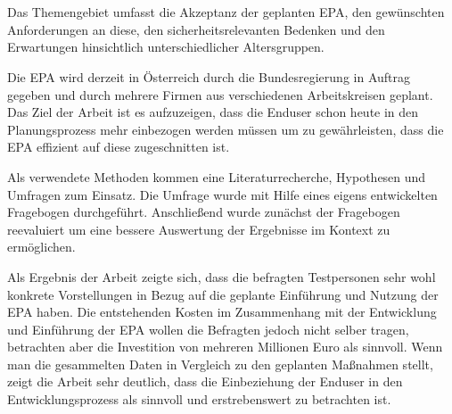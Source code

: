 
%
\section*{\thesisheading} %



 Das Themengebiet umfasst die Akzeptanz der geplanten
EPA, den gewünschten Anforderungen an diese, den sicherheitsrelevanten
Bedenken und den Erwartungen hinsichtlich unterschiedlicher Altersgruppen.~\cite[Kap.~1]{Baranyi2008}

 Die EPA wird derzeit in Österreich durch die
Bundesregierung in Auftrag gegeben und durch mehrere Firmen aus verschiedenen
Arbeitskreisen geplant. Das Ziel der Arbeit ist es aufzuzeigen, dass die
Enduser schon heute in den Planungsprozess mehr einbezogen werden müssen um zu
gewährleisten, dass die EPA effizient auf diese zugeschnitten ist.~\cite[Kap.~7]{Baranyi2008}

 Als verwendete Methoden kommen eine
Literaturrecherche, Hypothesen und Umfragen zum Einsatz. Die Umfrage wurde
mit Hilfe eines eigens entwickelten Fragebogen durchgeführt. Anschließend
wurde zunächst der Fragebogen reevaluiert um eine bessere Auswertung der
Ergebnisse im Kontext zu ermöglichen.~\cite[Kap.~5]{Baranyi2008}

 Als Ergebnis der Arbeit zeigte sich, dass die befragten
Testpersonen sehr wohl konkrete Vorstellungen in Bezug auf die geplante
Einführung und Nutzung der EPA haben. Die entstehenden Kosten im Zusammenhang
mit der Entwicklung und Einführung der EPA wollen die Befragten jedoch nicht
selber tragen, betrachten aber die Investition von mehreren Millionen Euro als
sinnvoll. Wenn man die gesammelten Daten in Vergleich zu den geplanten
Maßnahmen stellt, zeigt die Arbeit sehr deutlich, dass die Einbeziehung der
Enduser in den Entwicklungsprozess als sinnvoll und erstrebenswert zu
betrachten ist.~\cite[Kap.~7]{Baranyi2008}


%
\section*{\thesisheading} %

